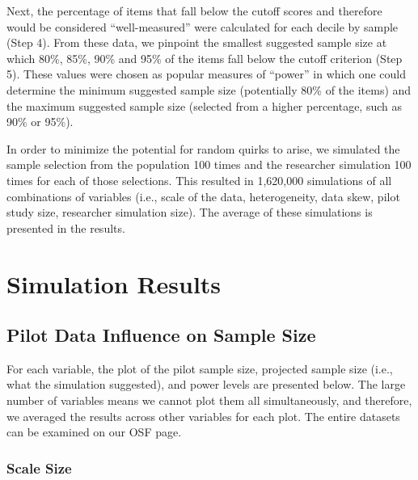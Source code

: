 \documentclass[
  man]{apa7}
\begin{document}
Next, the percentage of items that fall below the cutoff scores and therefore would be considered ``well-measured'' were calculated for each decile by sample (Step 4). From these data, we pinpoint the smallest suggested sample size at which 80\%, 85\%, 90\% and 95\% of the items fall below the cutoff criterion (Step 5). These values were chosen as popular measures of ``power'' in which one could determine the minimum suggested sample size (potentially 80\% of the items) and the maximum suggested sample size (selected from a higher percentage, such as 90\% or 95\%).

In order to minimize the potential for random quirks to arise, we simulated the sample selection from the population 100 times and the researcher simulation 100 times for each of those selections. This resulted in 1,620,000 simulations of all combinations of variables (i.e., scale of the data, heterogeneity, data skew, pilot study size, researcher simulation size). The average of these simulations is presented in the results.

\hypertarget{simulation-results}{%
\section{Simulation Results}\label{simulation-results}}

\hypertarget{pilot-data-influence-on-sample-size}{%
\subsection{Pilot Data Influence on Sample Size}\label{pilot-data-influence-on-sample-size}}

For each variable, the plot of the pilot sample size, projected sample size (i.e., what the simulation suggested), and power levels are presented below. The large number of variables means we cannot plot them all simultaneously, and therefore, we averaged the results across other variables for each plot. The entire datasets can be examined on our OSF page.

\hypertarget{scale-size}{%
\subsubsection{Scale Size}\label{scale-size}}
\end{document}

